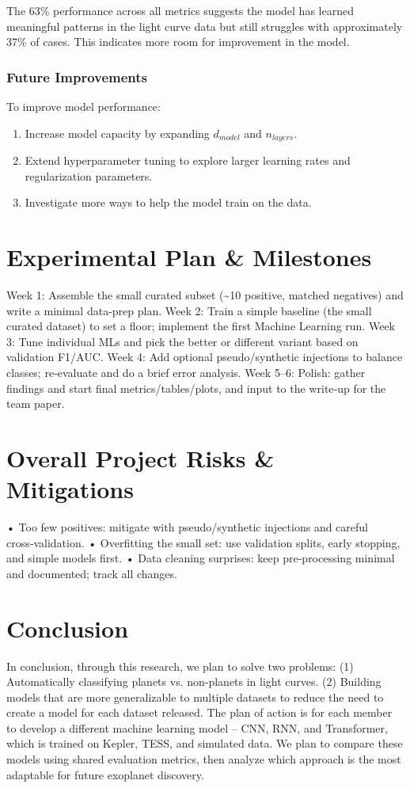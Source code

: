 \documentclass[letterpaper]{article} %
\begin{document}
The 63\% performance across all metrics suggests the model has learned meaningful patterns in the light curve data but still struggles with approximately 37\% of cases. This indicates more room for improvement in the model. 

\subsubsection*{Future Improvements}

To improve model performance:
\begin{enumerate}
    \item Increase model capacity by expanding \(d_{model}\) and \(n_{layers}\).
    \item Extend hyperparameter tuning to explore larger learning rates and regularization parameters.
    \item Investigate more ways to help the model train on the data.
\end{enumerate}


\section*{Experimental Plan \& Milestones}
Week 1: Assemble the small curated subset (\textasciitilde{}10 positive, matched negatives) and write a minimal data-prep plan.
Week 2: Train a simple baseline (the small curated dataset) to set a floor; implement the first Machine Learning run.
Week 3: Tune individual MLs and pick the better or different variant based on validation F1/AUC.
Week 4: Add optional pseudo/synthetic injections to balance classes; re‑evaluate and do a brief error analysis.
Week 5–6: Polish: gather findings and start final metrics/tables/plots, and input to the write‑up for the team paper.

\section*{Overall Project Risks \& Mitigations}
• Too few positives: mitigate with pseudo/synthetic injections and careful cross‑validation.
• Overfitting the small set: use validation splits, early stopping, and simple models first.
• Data cleaning surprises: keep pre-processing minimal and documented; track all changes.

\section*{Conclusion}
In conclusion, through this research, we plan to solve two problems: (1) Automatically classifying planets vs. non-planets in light curves. (2) Building models that are more generalizable to multiple datasets to reduce the need to create a model for each dataset released. The plan of action is for each member to develop a different machine learning model – CNN, RNN, and Transformer, which is trained on Kepler, TESS, and simulated data. We plan to compare these models using shared evaluation metrics, then analyze which approach is the most adaptable for future exoplanet discovery.
\end{document}
